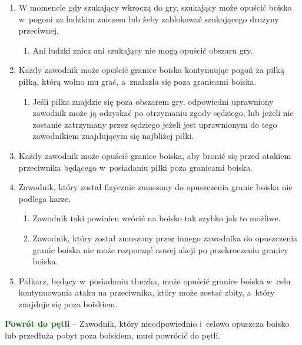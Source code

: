 \documentclass[12pt]{article}
\newcommand\other[1]{\bgroup\textcolor{darkgreen}{\textbf{#1}}}
\begin{document}
\begin{enumerate}
	\item
	      W momencie gdy szukający wkroczą do gry, szukający może opuścić boisko
	      w~pogoni za ludzkim zniczem lub żeby zablokować szukającego drużyny
	      przeciwnej.

	      \begin{enumerate}
		      \item
		            Ani ludzki znicz ani szukający nie mogą opuścić obszaru gry.
	      \end{enumerate}
	\item
	      Każdy zawodnik może opuścić granice boiska kontynuując pogoń za piłką
	      piłką, którą wolno mu grać, a~znalazła się poza granicami boiska.

	      \begin{enumerate}
		      \item
		            Jeśli piłka znajdzie się poza obszarem gry, odpowiedni uprawniony
		            zawodnik może ją odzyskać po otrzymaniu zgody sędziego, lub jeżeli
		            nie zostanie zatrzymany przez sędziego jeżeli jest uprawnionym do
		            tego zawodnikiem znajdującym się najbliżej piłki.
	      \end{enumerate}
	\item
	      Każdy zawodnik może opuścić granice boiska, aby bronić się przed
	      atakiem przeciwnika będącego w~posiadaniu piłki poza granicami boiska.
	\item
	      Zawodnik, który został fizycznie zmuszony do opuszczenia granic boiska
	      nie podlega karze.

	      \begin{enumerate}
		      \item
		            Zawodnik taki powinien wrócić na boisko tak szybko jak to możliwe.
		      \item
		            Zawodnik, który został zmuszony przez innego zawodnika do
		            opuszczenia granic boiska nie może rozpocząć nowej akcji po
		            przekroczeniu granicy boiska.
	      \end{enumerate}
	\item
	      Pałkarz, będący w~posiadaniu tłuczka, może opuścić granice boiska w~celu kontynuowania ataku na przeciwnika, który może zostać zbity, a~który znajduje się poza boiskiem.
\end{enumerate}

\other{Powrót do pętli} -- Zawodnik, który nieodpowiednio i~celowo opuszcza
boisko lub przedłuża pobyt poza boiskiem, musi powrócić do pętli.
\end{document}
